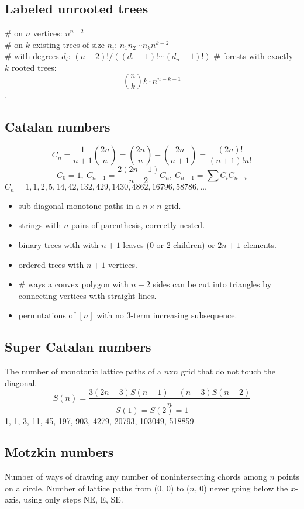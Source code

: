 \subsection{Labeled unrooted trees}
	\# on $n$ vertices: $n^{n-2}$ \\
	\# on $k$ existing trees of size $n_i$: $n_1n_2\cdots n_k n^{k-2}$\\
	\# with degrees $d_i$: $(n-2)! / ((d_1-1)! \cdots (d_n-1)!)$
	\# forests with exactly $k$ rooted trees: $$\binom{n}{k} k \cdot n^{n-k-1}$$.

\subsection{Catalan numbers}
	\[ C_n=\frac{1}{n+1}\binom{2n}{n}= \binom{2n}{n}-\binom{2n}{n+1} = \frac{(2n)!}{(n+1)!n!} \]
	\[ C_0=1,\ C_{n+1} = \frac{2(2n+1)}{n+2}C_n,\ C_{n+1}=\sum C_iC_{n-i} \]
	${C_n = 1, 1, 2, 5, 14, 42, 132, 429, 1430, 4862, 16796, 58786, \dots}$
	\begin{itemize}[noitemsep]
		\item sub-diagonal monotone paths in a $n\times n$ grid.
		\item strings with $n$ pairs of parenthesis, correctly nested.
		\item binary trees with with $n+1$ leaves (0 or 2 children) or $2n + 1$ elements.
		\item ordered trees with $n+1$ vertices.
		\item \# ways a convex polygon with $n+2$ sides can be cut into triangles by connecting vertices with straight lines.
		\item permutations of $[n]$ with no 3-term increasing subsequence.
	\end{itemize}

\subsection{Super Catalan numbers}
The number of monotonic lattice paths of a $n$x$n$ grid that do not touch the diagonal.\\
$$S(n) = \frac{3(2n-3)S(n-1)-(n-3)S(n-2)}{n}$$
$$S(1) = S(2) = 1$$
1, 1, 3, 11, 45, 197, 903, 4279, 20793, 103049, 518859\\

\subsection{Motzkin numbers}
Number of ways of drawing any number of nonintersecting chords among $n$ points on a circle. Number of lattice paths from (0, 0) to ($n$, 0) never going below the $x$-axis, using only steps NE, E, SE.\\

